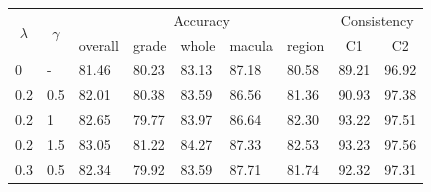 \begin{table}[!t]
\begin{center}
\begingroup
\setlength{\tabcolsep}{10pt} %
\renewcommand{\arraystretch}{1.5} %
\begin{tabular}{lllllllll}
\toprule
 \multicolumn{1}{c}{\multirow{2}{*}{$\lambda$}} & \multicolumn{1}{c}{\multirow{2}{*}{$\gamma$}} & \multicolumn{5}{c}{Accuracy}   & \multicolumn{2}{c}{Consistency}  \\ \cline{3-9} 
\multicolumn{1}{c}{}                         & \multicolumn{1}{c}{}      &  \multicolumn{1}{c}{overall}                       & \multicolumn{1}{c}{grade}      & \multicolumn{1}{c}{whole}        & \multicolumn{1}{c}{macula}        & \multicolumn{1}{c}{region}     & \multicolumn{1}{c}{C1}            & \multicolumn{1}{c}{C2}          
\\ \hline

\multicolumn{1}{l}{0}                     & \multicolumn{1}{l}{-}                    & \multicolumn{1}{l}{81.46} & \multicolumn{1}{l}{80.23} & \multicolumn{1}{l}{83.13} & \multicolumn{1}{l}{87.18} & \multicolumn{1}{l}{80.58} & \multicolumn{1}{l}{89.21} & \multicolumn{1}{l}{96.92} 

\\ \hline 

\multicolumn{1}{l}{0.2}                     & \multicolumn{1}{l}{0.5}                    & \multicolumn{1}{l}{82.01} & \multicolumn{1}{l}{80.38} & \multicolumn{1}{l}{83.59} & \multicolumn{1}{l}{86.56} & \multicolumn{1}{l}{81.36} & \multicolumn{1}{l}{90.93} & \multicolumn{1}{l}{97.38} 

\\ 
\multicolumn{1}{l}{0.2}                     & \multicolumn{1}{l}{1}                    & \multicolumn{1}{l}{82.65} & \multicolumn{1}{l}{ 79.77} & \multicolumn{1}{l}{ 83.97} & \multicolumn{1}{l}{ 86.64} & \multicolumn{1}{l}{82.30} & \multicolumn{1}{l}{ 93.22} & \multicolumn{1}{l}{97.51 } 

\\ 

\multicolumn{1}{l}{0.2}                     & \multicolumn{1}{l}{1.5}                    & \multicolumn{1}{l}{83.05} & \multicolumn{1}{l}{81.22} & \multicolumn{1}{l}{ 84.27} & \multicolumn{1}{l}{ 87.33} & \multicolumn{1}{l}{82.53} & \multicolumn{1}{l}{ 93.23} & \multicolumn{1}{l}{ 97.56} 


\\ \hline 
\multicolumn{1}{l}{0.3}                     & \multicolumn{1}{l}{0.5}                   & \multicolumn{1}{l}{82.34} & \multicolumn{1}{l}{ 79.92} & \multicolumn{1}{l}{ 83.59} & \multicolumn{1}{l}{ 87.71} & \multicolumn{1}{l}{81.74} & \multicolumn{1}{l}{ 92.32} & \multicolumn{1}{l}{ 97.31} 


\end{tabular}
\end{center}
\end{table}
